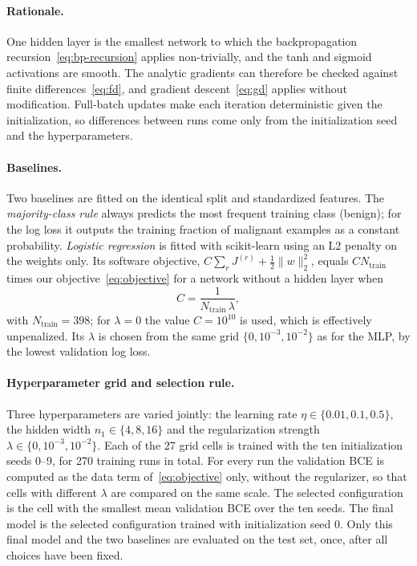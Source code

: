 \paragraph{Rationale.}
One hidden layer is the smallest network to which the backpropagation recursion~\eqref{eq:bp-recursion} applies non-trivially, and the tanh and sigmoid activations are smooth. The analytic gradients can therefore be checked against finite differences~\eqref{eq:fd}, and gradient descent~\eqref{eq:gd} applies without modification. Full-batch updates make each iteration deterministic given the initialization, so differences between runs come only from the initialization seed and the hyperparameters.

\paragraph{Baselines.}
Two baselines are fitted on the identical split and standardized features. The \emph{majority-class rule} always predicts the most frequent training class (benign); for the log loss it outputs the training fraction of malignant examples as a constant probability. \emph{Logistic regression} is fitted with scikit-learn using an L2 penalty on the weights only. Its software objective, $C\sum_r J^{(r)}+\tfrac12\lVert w\rVert_2^{2}$, equals $C N_{\mathrm{train}}$ times our objective~\eqref{eq:objective} for a network without a hidden layer when
\begin{equation}
  C=\frac{1}{N_{\mathrm{train}}\,\lambda},
  \label{eq:logreg-c}
\end{equation}
with $N_{\mathrm{train}}=398$; for $\lambda=0$ the value $C=10^{10}$ is used, which is effectively unpenalized. Its $\lambda$ is chosen from the same grid $\{0,10^{-3},10^{-2}\}$ as for the MLP, by the lowest validation log loss.

\paragraph{Hyperparameter grid and selection rule.}
Three hyperparameters are varied jointly: the learning rate $\eta\in\{0.01,0.1,0.5\}$, the hidden width $n_1\in\{4,8,16\}$ and the regularization strength $\lambda\in\{0,10^{-3},10^{-2}\}$. Each of the 27 grid cells is trained with the ten initialization seeds 0--9, for 270 training runs in total. For every run the validation BCE is computed as the data term of~\eqref{eq:objective} only, without the regularizer, so that cells with different $\lambda$ are compared on the same scale. The selected configuration is the cell with the smallest mean validation BCE over the ten seeds. The final model is the selected configuration trained with initialization seed 0. Only this final model and the two baselines are evaluated on the test set, once, after all choices have been fixed.

